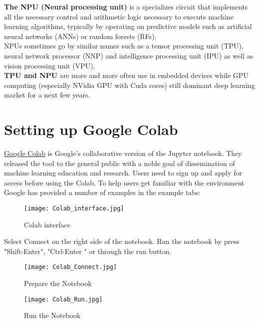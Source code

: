 \documentclass[a4paper,10pt]{article}
\begin{document}
\textbf{The NPU (Neural processing unit)} is a specializes circuit that implements all the necessary control and arithmetic logic necessary to execute machine learning algorithms, typically by operating on predictive models such as artificial neural networks (ANNs) or random forests (RFs).\\
NPUs sometimes go by similar names such as a tensor processing unit (TPU), neural network processor (NNP) and intelligence processing unit (IPU) as well as vision processing unit (VPU).\\
\textbf{TPU and NPU} are more and more often use in embedded devices while GPU computing (especially NVidia GPU with Cuda cores) still dominant deep learning market for a next few years.



\section{Setting up Google Colab}
\label{sec:Colab}

\href{https://colab.research.google.com/}{Google Colab} is Google's collaborative version of the Jupyter notebook. They released the tool to the general public with a noble goal of dissemination of machine learning education and research.\cite{Colab}
Users need to sign up and apply for access before using the Colab. 
To help users get familiar with the environment Google has provided a number of examples in the example tabs: 

\begin{figure}[H]
\centering
\texttt{[image: Colab\_interface.jpg]}
\caption[Short title]{Colab interface}
\label{fig:ff1}\end{figure}

\vspace{2mm}

Select Connect on the right side of the notebook. Run the notebook by press "Shift-Enter", "Ctrl-Enter " or through the run button.    

\vspace{2mm}

\begin{figure}[H]
\centering
\texttt{[image: Colab\_Connect.jpg]}
\caption[Short title]{Prepare the Notebook}
\label{fig:ff1}\end{figure}


\begin{figure}[H]
\centering
\texttt{[image: Colab\_Run.jpg]}
\caption[Short title]{Run the Notebook}
\label{fig:ff1}\end{figure}
\end{document}
